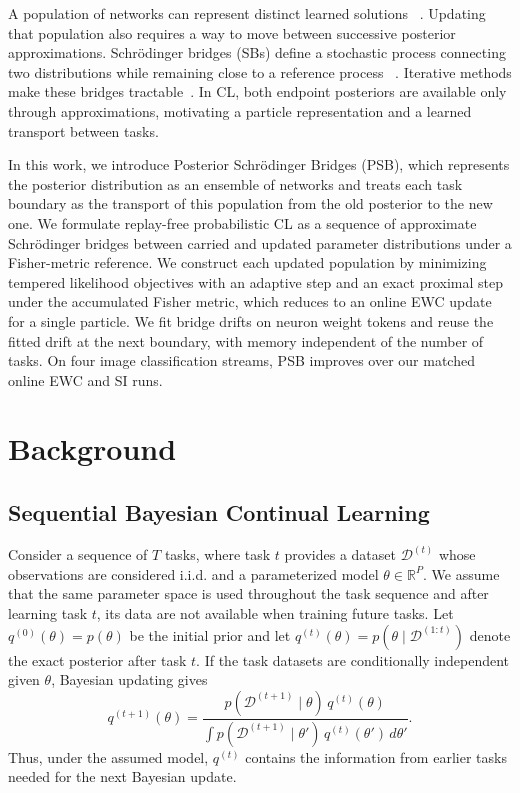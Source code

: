 \documentclass{article}
\begin{document}
A population of networks can represent distinct learned solutions
~\cite{lakshminarayanan2017ensembles}. Updating that population also
requires a way to move between successive posterior approximations.
Schr\"odinger bridges (SBs) define a stochastic process connecting two
distributions while remaining close to a reference process
~\cite{leonard2014survey}. Iterative methods make these bridges
tractable~\cite{debortoli2021dsb,shi2023dsbm}. In CL, both endpoint
posteriors are available only through approximations, motivating a
particle representation and a learned transport between tasks.

In this work, we introduce Posterior Schr\"odinger Bridges (PSB), which represents the posterior distribution as an ensemble of networks and treats each task boundary as the transport of this population from the old posterior to the new one. We formulate replay-free
probabilistic CL as a sequence of approximate Schr\"odinger bridges between
carried and updated parameter distributions under a Fisher-metric reference. We
construct each updated population by minimizing tempered likelihood objectives
with an adaptive step and an exact proximal step under the accumulated Fisher
metric, which reduces to an online EWC update for a single particle. We fit
bridge drifts on neuron weight tokens and reuse the fitted drift at the next
boundary, with memory independent of the number of tasks. On four image
classification streams, PSB improves over our matched online EWC and SI runs.



\section{Background}

\subsection{Sequential Bayesian Continual Learning}

Consider a sequence of $T$ tasks, where task $t$ provides a dataset $\mathcal{D}^{(t)}$ whose observations are considered i.i.d. and a parameterized model $\theta\in\mathbb{R}^P$. We assume that the same parameter space is used throughout the task sequence and after learning task $t$, its data are not available when training future tasks. Let $q^{(0)}(\theta)=p(\theta)$ be the initial prior and let $q^{(t)}(\theta) = p(\theta\mid\mathcal{D}^{(1:t)})$ denote the exact posterior after task $t$. If the task datasets are conditionally independent given $\theta$, Bayesian updating gives
\begin{equation}
    q^{(t+1)}(\theta)
    = \frac{p(\mathcal{D}^{(t+1)}\mid\theta)\,q^{(t)}(\theta)}
           {\int p(\mathcal{D}^{(t+1)}\mid\theta')\,q^{(t)}(\theta')\,d\theta'}.
    \label{eq:sequential_bayes}
\end{equation}
Thus, under the assumed model, $q^{(t)}$ contains the information from earlier tasks needed for the next Bayesian update.
\end{document}
